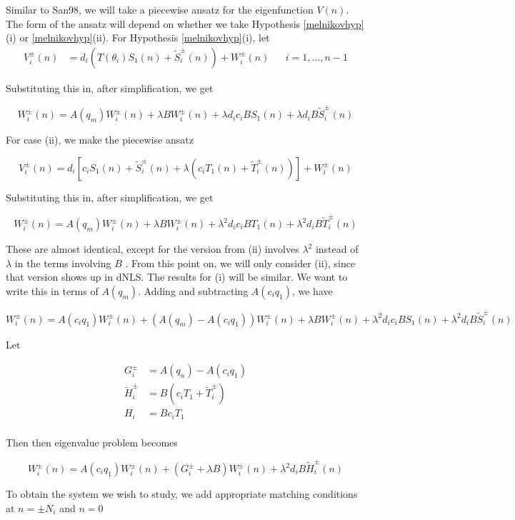 \documentclass[12pt]{article}
\begin{document}
Similar to San98, we will take a piecewise ansatz for the eigenfunction $V(n)$. The form of the ansatz will depend on whether we take Hypothesis \ref{melnikovhyp}(i) or \ref{melnikovhyp}(ii).
For Hypothesis \ref{melnikovhyp}(i), let
\begin{align*}
V_i^\pm(n) &= d_i ( T(\theta_i) S_1(n) + \tilde{S}_i^\pm(n) ) + W_i^\pm(n)
&& i = 1, \dots, n-1
\end{align*}

Substituting this in, after simplification, we get

\[
W_i^\pm(n) = A(q_m) W_i^\pm(n) + \lambda B W_i^\pm(n) + \lambda d_i c_i B S_1(n) + \lambda d_i B \tilde{S}_i^\pm(n)
\]

For case (ii), we make the piecewise ansatz

\[
V_i^\pm(n) = d_i [ c_i S_1(n) + \tilde{S}_i^\pm(n) + \lambda(c_i T_1(n) + \tilde{T}_i^\pm(n))] + W_i^\pm(n)
\]

Substituting this in, after simplification, we get

\[
W_i^\pm(n) = A(q_m) W_i^\pm(n) + \lambda B W_i^\pm(n) + \lambda^2 d_i c_i B T_1(n) + \lambda^2 d_i B \tilde{T}_i^\pm(n)
\]

These are almost identical, except for the version from (ii) involves $\lambda^2$ instead of $\lambda$ in the terms involving $B$ . From this point on, we will only consider (ii), since that version shows up in dNLS. The results for (i) will be similar. We want to write this in terms of $A(q_m)$. Adding and subtracting $A(c_i q_1)$, we have

\[
W_i^\pm(n) = A(c_i q_1) W_i^\pm(n) + (A(q_m) - A(c_i q_1)) W_i^\pm(n) + \lambda B W_i^\pm(n) + \lambda^2 d_i c_i B S_1(n) + \lambda^2 d_i B \tilde{S}_i^\pm(n)
\]

Let

\begin{align*}
G_i^\pm &= A(q_n) - A(c_i q_1) \\
\tilde{H}_i^\pm &= B( c_i T_1 + \tilde{T}_i^\pm ) \\
H_i &= B c_i T_1 \\
\end{align*}

Then then eigenvalue problem becomes

\[
W_i^\pm(n) = A(c_i q_1) W_i^\pm(n) + (G_i^\pm + \lambda B) W_i^\pm(n) + \lambda^2 d_i B \tilde{H}_i^\pm(n)
\]

To obtain the system we wish to study, we add appropriate matching conditions at $n = \pm N_i$ and $n = 0$
\end{document}
